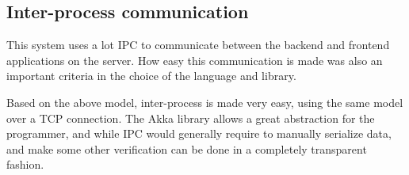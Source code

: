 \subsection{Inter-process communication}
This system uses a lot IPC to communicate between the backend and frontend
applications on the server. How easy this communication is made was 
also an important criteria in the choice of the language and library.

Based on the above model, inter-process is made very easy, 
using the same model over a TCP connection. The Akka library allows a 
great abstraction for the programmer, and while IPC would 
generally require to manually serialize data, and make
 some other verification  can be done in a completely transparent fashion.